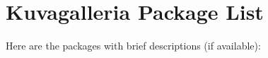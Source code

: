 \section{Kuvagalleria Package List}
Here are the packages with brief descriptions (if available):\begin{CompactList}
\item{}
\item{}
\item{}
\end{CompactList}
